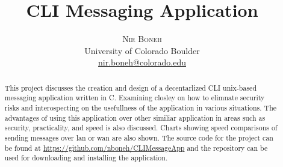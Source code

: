 \documentclass[twoside]{article}
\title{\vspace{-15mm}\fontsize{24pt}{10pt}\selectfont\textbf{CLI Messaging Application}} %
\author{
\large
\textsc{Nir Boneh}\\[2mm] %
\normalsize University of Colorado Boulder \\ %
\normalsize \href{mailto:nir.boneh@colorado.edu}{nir.boneh@colorado.edu} \\ %
\vspace{-5mm}
}
\date{}
\begin{document}
\maketitle %

\thispagestyle{fancy} %


\begin{abstract}

\noindent
This project discusses the creation and design of a decentarlized CLI unix-based messaging application written in C. Examining 
closley on how to elimnate security risks and interospecting on the usefullness of the application in various situations. The 
advantages of using this application over other similiar application in areas such as security, practicality, and speed is also 
discussed. Charts showing speed comparisons of sending messages over lan or wan are also shown. The source code for the project can be found at \href{https://github.com/nboneh/CLIMessageApp}{https://github.com/nboneh/CLIMessageApp} and the repository can be used for downloading and installing the application.

\end{abstract}

\end{document}
